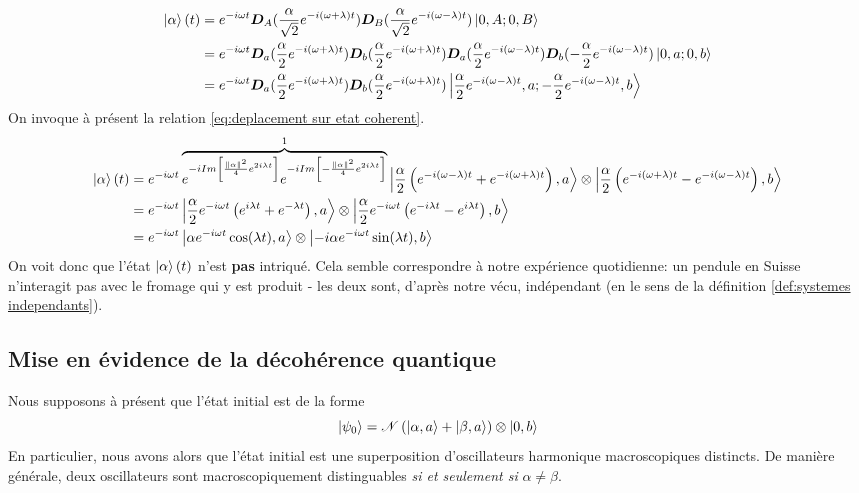 \documentclass[11pt,oneside,a4paper]{article}
\begin{document}
\begin{align*}
  \ket{\alpha}(t) &= e^{-i\omega t}\bm{D}_A(\frac{\alpha}{\sqrt{2}}e^{-i\left(\omega+\lambda\right)t})\bm{D}_B(\frac{\alpha}{\sqrt{2}}e^{-i\left(\omega-\lambda\right)t})\ket{0,A;0,B}\\
  &= e^{-i\omega t}\bm{D}_a(\frac{\alpha}{2}e^{-i\left(\omega+\lambda\right)t})\bm{D}_b(\frac{\alpha}{2}e^{-i\left(\omega+\lambda\right)t})\bm{D}_a(\frac{\alpha}{2}e^{-i\left(\omega-\lambda\right)t})\bm{D}_b(-\frac{\alpha}{2}e^{-i\left(\omega-\lambda\right)t})\ket{0,a;0,b}\\
  &= e^{-i\omega t}\bm{D}_a(\frac{\alpha}{2}e^{-i\left(\omega+\lambda\right)t})\bm{D}_b(\frac{\alpha}{2}e^{-i\left(\omega+\lambda\right)t})\ket{\frac{\alpha}{2}e^{-i\left(\omega-\lambda\right)t},a;-\frac{\alpha}{2}e^{-i\left(\omega-\lambda\right)t},b}
\end{align*}
On invoque à présent la relation \eqref{eq:deplacement sur etat coherent}.
\begin{align}
  \ket{\alpha}(t) &= e^{-i\omega t}\overbrace{e^{-iIm\left[\frac{\norm{\alpha}^2}{4}e^{2i\lambda t}\right]}e^{-iIm\left[-\frac{\norm{\alpha}^2}{4}e^{2i\lambda t}\right]}}^1\ket{\frac{\alpha}{2}\left(e^{-i\left(\omega-\lambda\right)t}+e^{-i\left(\omega+\lambda\right)t}\right),a}\otimes\ket{\frac{\alpha}{2}\left(e^{-i\left(\omega+\lambda\right)t}-e^{-i\left(\omega-\lambda\right)t}\right),b}\notag\\
  &= e^{-i\omega t}\ket{\frac{\alpha}{2}e^{-i\omega t}\left(e^{i\lambda t}+e^{-\lambda t}\right),a}\otimes\ket{\frac{\alpha}{2}e^{-i\omega t}\left(e^{-i\lambda t}-e^{i\lambda t}\right),b}\notag\\
  &= e^{-i\omega t}\ket{\alpha e^{-i\omega t}\cos(\lambda t),a}\otimes\ket{-i\alpha e^{-i\omega t}\sin(\lambda t),b}\label{eq:etat naif evolue}
\end{align}
On voit donc que l'état $\ket{\alpha}(t)$ n'est \textbf{pas} intriqué. Cela semble correspondre à notre expérience quotidienne: un pendule en Suisse n'interagit pas avec le fromage qui y est produit - les deux sont, d'après notre vécu, indépendant (en le sens de la définition \ref{def:systemes independants}).

\subsection{Mise en évidence de la décohérence quantique}
Nous supposons à présent que l'état initial est de la forme
\begin{equation}
  \ket{\psi_0} = \mathcal{N}\left(\ket{\alpha,a}+\ket{\beta,a}\right)\otimes\ket{0,b}\label{eq:quantum decoherence initial state}
\end{equation}
En particulier, nous avons alors que l'état initial est une superposition d'oscillateurs harmonique macroscopiques distincts. De manière générale, deux oscillateurs sont macroscopiquement distinguables \emph{si et seulement si} $\alpha\neq\beta$.
\end{document}
